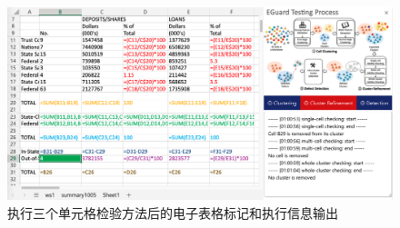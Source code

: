 \begin{figure}[tp]    
    \centering
    \includegraphics[width=\textwidth]{figure/eg/eguard-3.png}
    \caption{\eg 执行三个单元格检验方法后的电子表格标记和执行信息输出}
    \label{figure-eg3}
\end{figure}